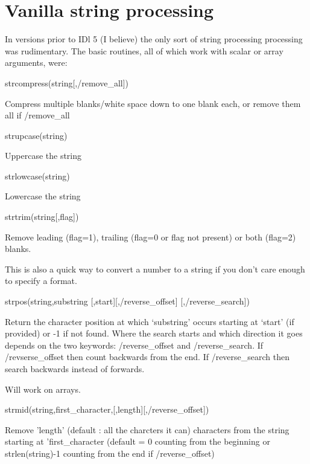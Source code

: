 \section{Vanilla string processing}%

In versions prior to IDl 5 (I believe) the only sort of string
processing processing was rudimentary. The basic routines, all of
which work with scalar or array arguments, were:

\bi

   \item strcompress(string[,/remove\_all])

     Compress multiple blanks/white space down to one blank each, or
     remove them all if /remove\_all

   \item strupcase(string)

     Uppercase the string

   \item strlowcase(string)

     Lowercase the string

   \item strtrim(string[,flag])

     Remove leading (flag=1), trailing (flag=0 or flag not present)
     or both (flag=2) blanks.

     This is also a quick way to convert a number to a string if you
     don't care enough to specify a format.

   \item strpos(string,substring
            [,start][,/reverse\_offset]
	    [,/reverse\_search])

     Return the character position at which `substring' occurs
     starting at `start' (if provided) or -1 if not found. Where the
     search starts and which direction it goes depends on the two
     keywords: /reverse\_offset and /reverse\_search. If
     /revserse\_offset then count backwards from the end. If
     /reverse\_search then search backwards instead of forwards.

     Will work on arrays.

   \item strmid(string,first\_character,[,length][,/reverse\_offset])

     Remove 'length' (default : all the charcters it can) characters
     from the string starting at 'first\_character (default = 0
     counting from the beginning or strlen(string)-1 counting from the
     end if /reverse\_offset)

